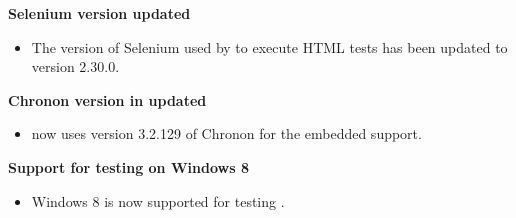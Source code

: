 \textbf{Selenium version updated}
\begin{itemize}
\item The version of Selenium used by \app{} to execute HTML tests has been updated to version 2.30.0.
\end{itemize}

\textbf{Chronon version in \app{} updated }
\begin{itemize}
\item \app{} now uses version 3.2.129 of Chronon for the embedded support.
\end{itemize}

\textbf{Support for testing on Windows 8}
\begin{itemize}
\item Windows 8 is now supported for testing \gdauts{}.
\end{itemize}
